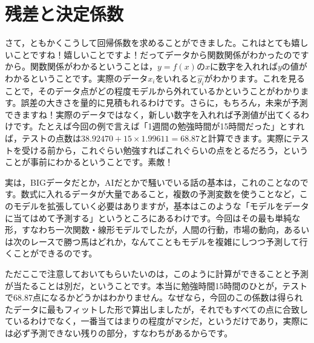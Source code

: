 \documentclass{ltjbook}
\begin{document}


\section{残差と決定係数}
さて，ともかくこうして回帰係数を求めることができました。これはとても嬉しいことですね！嬉しいことですよ！だってデータから関数関係がわかったのですから。関数関係がわかるということは，$y=f(x)$の$x$に数字を入れれば$y$の値がわかるということです。実際のデータ$x_i$をいれると$\hat{y_i}$がわかります。これを見ることで，そのデータ点がどの程度モデルから外れているかということがわかります。誤差の大きさを量的に見積もれるわけです。さらに，もちろん，未来が予測できますね！実際のデータではなく，新しい数字を入れれば予測値が出てくるわけです。たとえば今回の例で言えば「1週間の勉強時間が15時間だった」とすれば，テストの点数は$38.92470+15\times1.99611=68.87$と計算できます。実際にテストを受ける前から，これぐらい勉強すればこれぐらいの点をとるだろう，ということが事前にわかるということです。素敵！

実は，BIGデータだとか，AIだとかで騒いでいる話の基本は，これのことなのです。数式に入れるデータが大量であること，複数の予測変数を使うことなど，このモデルを拡張していく必要はありますが，基本はこのような「モデルをデータに当てはめて予測する」というところにあるわけです。今回はその最も単純な形，すなわち一次関数・線形モデルでしたが，人間の行動，市場の動向，あるいは次のレースで勝つ馬はどれか，なんてこともモデルを複雑にしつつ予測して行くことができるのです。

ただここで注意しておいてもらいたいのは，このように計算ができることと予測が当たることは別だ，ということです。本当に勉強時間15時間のひとが，テストで68.87点になるかどうかはわかりません。なぜなら，今回のこの係数は得られたデータに最もフィットした形で算出しましたが，それでもすべての点に合致しているわけでなく，一番当てはまりの程度がマシだ，というだけであり，実際には必ず予測できない残りの部分，すなわちがあるからです。
\end{document}

